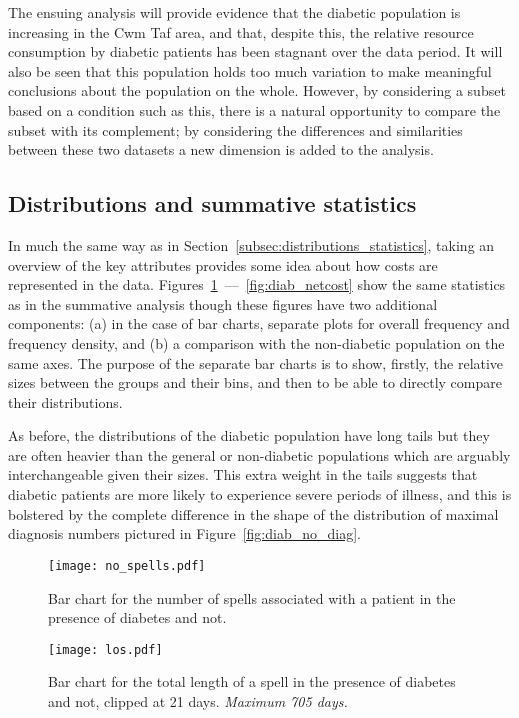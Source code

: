 The ensuing analysis will provide evidence that the diabetic population is
increasing in the Cwm Taf area, and that, despite this, the relative resource
consumption by diabetic patients has been stagnant over the data period. It will
also be seen that this population holds too much variation to make meaningful 
conclusions about the population on the whole. However, by considering a subset
based on a condition such as this, there is a natural opportunity to compare
the subset with its complement; by considering the differences and similarities
between these two datasets a new dimension is added to the analysis.


\subsection{Distributions and summative statistics}%
\label{subsec:diab_dists_stats}

In much the same way as in Section~\ref{subsec:distributions_statistics}, taking
an overview of the key attributes provides some idea about how costs are
represented in the data.
Figures~\ref{fig:diab_no_spells}~---~\ref{fig:diab_netcost} show
the same statistics as in the summative analysis though these figures have two
additional components: (a) in the case of bar charts, separate plots for overall
frequency and frequency density, and (b) a comparison with the non-diabetic
population on the same axes. The purpose of the separate bar charts is to show,
firstly, the relative sizes between the groups and their bins, and then to be
able to directly compare their distributions.

As before, the distributions of the diabetic population have long tails but they
are often heavier than the general or non-diabetic populations which are
arguably interchangeable given their sizes. This extra weight in the tails
suggests that diabetic patients are more likely to experience severe periods of
illness, and this is bolstered by the complete difference in the shape of the
distribution of maximal diagnosis numbers pictured in
Figure~\ref{fig:diab_no_diag}.

\begin{figure}[htbp]
    \centering
    \texttt{[image: no\_spells.pdf]}
    \caption{Bar chart for the number of spells associated with a patient in the
        presence of diabetes and not.}%
    \label{fig:diab_no_spells}
\end{figure}

\begin{figure}[htbp]
    \centering
    \texttt{[image: los.pdf]}
    \caption{Bar chart for the total length of a spell in the presence of
        diabetes and not, clipped at 21 days. \textit{Maximum 705 days.}}%
    \label{fig:diab_los}
\end{figure}

